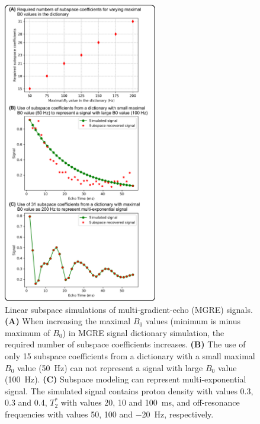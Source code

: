 \documentclass[a4paper,11pt]{article}
\def\InternRev{}
\begin{document}
\begin{figure}[H]
	\centering
\ifdefined\InternRev
	\includegraphics[width=0.6\textwidth]{../figures/fig1.png}
\fi
	\caption{Linear subspace simulations of multi-gradient-echo (MGRE) signals.
	\textbf{(A)} When increasing the maximal $B_0$ values
	(minimum is minus maximum of $B_0$)
	in MGRE signal dictionary simulation,
	the required number of subspace coefficients increases.
	\textbf{(B)} The use of only 15 subspace coefficients from a dictionary
	with a small maximal $B_0$ value (\SI{50}{Hz}) can not represent a signal
	with large $B_0$ value (\SI{100}{Hz}).
	\textbf{(C)} Subspace modeling can represent multi-exponential signal.
	The simulated signal contains
	proton density with values \num{0.3}, \num{0.3} and \num{0.4},
	$T_2^*$ with values \num{20}, \num{10} and \num{100}~\si{\ms}, and
	off-resonance frequencies with values \num{50}, \num{100} and \num{-20}~\si{\Hz},
	respectively.}
	\label{FIG:SubspaceSim}
\end{figure}

\ifdefined\InternRev
\pagebreak
\fi
\end{document}
